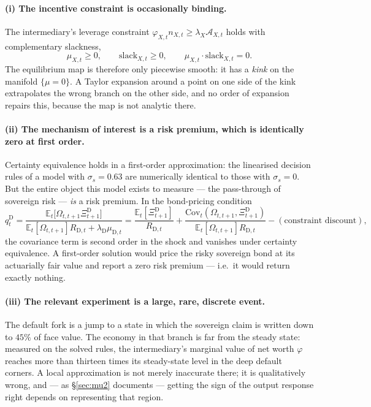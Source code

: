 \documentclass[11pt]{article}
\numberwithin{equation}{section}
\newcommand{\E}{\mathbb{E}}
\newcommand{\D}{\mathrm{D}}
\theoremstyle{definition}
\theoremstyle{plain}
\theoremstyle{remark}
\begin{document}
\paragraph{(i) The incentive constraint is occasionally binding.} The intermediary's
leverage constraint $\varphi_{X,t}n_{X,t}\ge\lambda_X\mathcal{A}_{X,t}$ holds with
complementary slackness,
\begin{equation}
\mu_{X,t}\ge0,\qquad
\mathrm{slack}_{X,t}\ge0,\qquad
\mu_{X,t}\cdot\mathrm{slack}_{X,t}=0 .
\label{eq:kkt}
\end{equation}
The equilibrium map is therefore only piecewise smooth: it has a \emph{kink} on the
manifold $\{\mu=0\}$. A Taylor expansion around a point on one side of the kink
extrapolates the wrong branch on the other side, and no order of expansion repairs
this, because the map is not analytic there.

\paragraph{(ii) The mechanism of interest is a risk premium, which is identically
zero at first order.} Certainty equivalence holds in a first-order approximation:
the linearised decision rules of a model with $\sigma_s=0.63$ are numerically
identical to those with $\sigma_s=0$. But the entire object this model exists to
measure --- the pass-through of sovereign risk --- \emph{is} a risk premium. In the
bond-pricing condition
\begin{equation}
q^{\D}_t=\frac{\E_t\bigl[\Omega_{t,t+1}\Xi^{\D}_{t+1}\bigr]}
              {\E_t[\Omega_{t,t+1}]R_{\D,t}+\lambda_\D\mu_{\D,t}}
       =\frac{\E_t[\Xi^{\D}_{t+1}]}{R_{\D,t}}
       +\frac{\mathrm{Cov}_t(\Omega_{t,t+1},\Xi^{\D}_{t+1})}{\E_t[\Omega_{t,t+1}]R_{\D,t}}
       -(\text{constraint discount}),
\label{eq:bondprice}
\end{equation}
the covariance term is second order in the shock and vanishes under certainty
equivalence. A first-order solution would price the risky sovereign bond at its
actuarially fair value and report a zero risk premium --- i.e.\ it would return
exactly nothing.

\paragraph{(iii) The relevant experiment is a large, rare, discrete event.} The
default fork is a jump to a state in which the sovereign claim is written down to
$45\%$ of face value. The economy in that branch is far from the steady state:
measured on the solved rules, the intermediary's marginal value of net worth
$\varphi$ reaches more than thirteen times its steady-state level in the deep
default corners. A local approximation is not merely inaccurate there; it is
qualitatively wrong, and --- as \S\ref{sec:mu2} documents --- getting the sign of the
output response right depends on representing that region.
\end{document}
